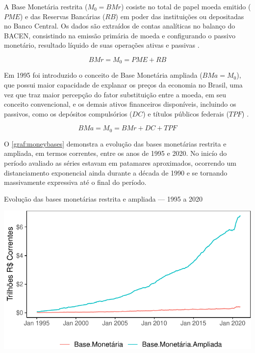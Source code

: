 \documentclass[
  12pt,
  12pt,
  openright,
  oneside,
  a4paper,
  chapter=TITLE,
  section=TITLE,
  subsection=TITLE,
  subsubsection=TITLE,
  english,
  portugues,
  sumario=tradicional]{abntex2}
\begin{document}
A Base Monetária restrita (\(M_0 = BMr\)) cosiste no total de papel moeda emitido (\(PME\)) e das Reservas Bancárias (\(RB\)) em poder das instituições ou depositadas no Banco Central. Os dados são extraídos de contas analíticas no balanço do BACEN, consistindo na emissão primária de moeda e configurando o passivo monetário, resultado líquido de suas operações ativas e passivas \cite{bcb:2019}.

\begin{equation}
BMr = M_0 = PME + RB
\end{equation}

Em 1995 foi introduzido o conceito de Base Monetária ampliada (\(BMa = M_0\)), que possui maior capacidade de explanar os preços da economia no Brasil, uma vez que traz maior percepção do fator substituição entre a moeda, em seu conceito convencional, e os demais ativos financeiros disponíveis, incluindo os passivos, como os depósitos compulsórios (\(DC\)) e títulos públicos federais (\(TPF\)) \cite{bcb:2019}.

\begin{equation}
BMa = M_0 = BMr + DC +  TPF
\end{equation}

O \autoref{graf:moneybases} demonstra a evolução das bases monetárias restrita e ampliada, em termos correntes, entre os anos de 1995 e 2020. No inicío do período avaliado as séries estavam em patamares aproximados, ocorrendo um distanciamento exponencial ainda durante a década de 1990 e se tornando massivamente expressiva até o final do período.

\begin{grafico}[!htbp]
\vspace{20pt}
\caption{Evolução das bases monetárias restrita e ampliada — 1995 a 2020}
\vspace{-4mm}

\begin{center}\includegraphics{12-exportedfigures/money.base.d-1} \end{center}
\vspace{-3mm}
\label{graf:moneybases}
\vspace{-2mm}
\end{grafico}
\end{document}
